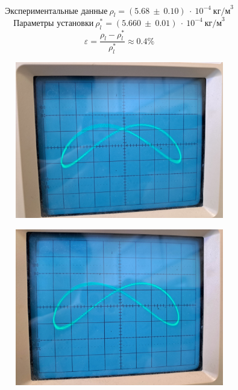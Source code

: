 \documentclass[a4paper, 12pt]{article}
\begin{document}
\[\textit{Экспериментальные данные} \ \rho_l = (5.68 \ \pm \ 0.10)  \ \cdot \ 10^{-4} \ \textit{кг/м}^3\]
\[ \textit{Параметры установки} \ \rho^{*}_{l} = (5.660 \ \pm \ 0.01)  \ \cdot \ 10^{-4} \ \textit{кг/м}^3\]
\[\varepsilon = \frac{\rho_l - \rho^{*}_{l}}{\rho^{*}_{l}} \approx 0.4 \%\]

\begin{figure}[H]
    \centering
    
    \begin{subfigure}[b]{0.45\textwidth}
        \centering
        \includegraphics[width=\textwidth]{1.jpg}
    \end{subfigure}
    \hfill
    \begin{subfigure}[b]{0.45\textwidth}
        \centering
        \includegraphics[width=\textwidth]{2.jpg}
    \end{subfigure}
    

\end{figure}
\end{document}
